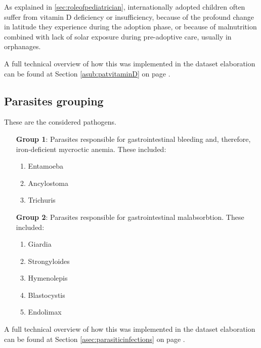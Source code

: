 As explained in \ref{sec:roleofpediatrician}, internationally adopted children often suffer from vitamin D deficiency or insufficiency, because of the profound change in latitude they experience during the adoption phase, or because of malnutrition combined with lack of solar exposure during pre-adoptive care, usually in orphanages.

A full technical overview of how this was implemented in the dataset elaboration can be found at Section \ref{asub:patvitaminD} on page \pageref{asub:patvitaminD}.


\subsection{Parasites grouping}\label{sub:parasites}
These are the considered pathogens.

\begin{enumerate}[leftmargin=6em]
	\item [\textbf{Group 1}:] Parasites responsible for gastrointestinal bleeding and, therefore, iron-deficient mycroctic anemia. These included:
		\begin{enumerate}[label=\alph*)]
			\item Entamoeba
			\item Ancylostoma
			\item Trichuris
		\end{enumerate}
	\item [\textbf{Group 2}:] Parasites responsible for gastrointestinal malabsorbtion. These included:
		\begin{enumerate}[label=\alph*)]
			\item Giardia
			\item Strongyloides
			\item Hymenolepis
			\item Blastocystis
			\item Endolimax
		\end{enumerate}
\end{enumerate}

A full technical overview of how this was implemented in the dataset elaboration can be found at Section \ref{asec:parasiticinfections} on page \pageref{asec:parasiticinfections}.

